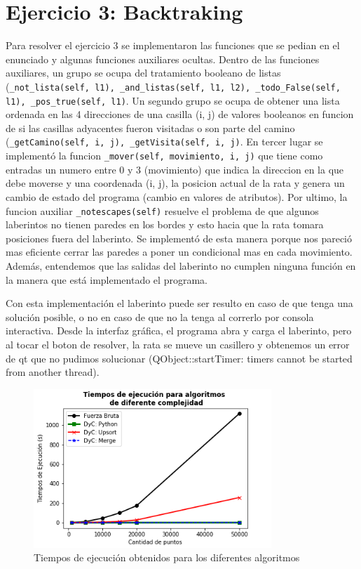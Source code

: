 \documentclass[12pt,a4paper]{article}
\begin{document}
\section{Ejercicio 3: Backtraking}

Para resolver el ejercicio 3 se implementaron las funciones que se pedian en el enunciado y algunas funciones auxiliares ocultas. Dentro de las funciones auxiliares, un grupo se ocupa del tratamiento booleano de listas (\texttt{_not_lista(self, l1), _and_listas(self, l1, l2), _todo_False(self, l1), _pos_true(self, l1)}. Un segundo grupo se ocupa de obtener una lista ordenada en las 4 direcciones de una casilla (i, j) de valores booleanos en funcion de si las casillas adyacentes fueron visitadas o son parte del camino (\texttt{_getCamino(self, i, j), _getVisita(self, i, j)}. En tercer lugar se implementó la funcion \texttt{_mover(self, movimiento, i, j)} que tiene como entradas un numero entre 0 y 3 (movimiento) que indica la direccion en la que debe moverse y una coordenada (i, j), la posicion actual de la rata y genera un cambio de estado del programa (cambio en valores de atributos). Por ultimo, la funcion auxiliar \texttt{_notescapes(self)} resuelve el problema de que algunos laberintos no tienen paredes en los bordes y esto hacia que la rata tomara posiciones fuera del laberinto. Se implementó de esta manera porque nos pareció mas eficiente cerrar las paredes a poner un condicional mas en cada movimiento. Además, entendemos que las salidas del laberinto no cumplen ninguna función en la manera que está implementado el programa.\par
Con esta implementación el laberinto puede ser resulto en caso de que tenga una solución posible, o no en caso de que no la tenga al correrlo por consola interactiva. Desde la interfaz gráfica, el programa abra y carga el laberinto, pero al tocar el boton de resolver, la rata se mueve un casillero y obtenemos un error de qt que no pudimos solucionar (QObject::startTimer: timers cannot be started from another thread).


\begin{figure}
  \centering
    \includegraphics[width=0.8\textwidth]{GraficosEj1}
  \caption{Tiempos de ejecución obtenidos para los diferentes       algoritmos}
  \label{fig:ejemplo}
\end{figure}
\end{document}
